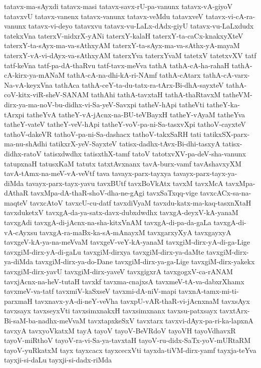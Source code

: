 {tatavx-ma-sAyxdi
tatavx-masi
tatavx-savx-rU-pa-vanunx
tatavx-vA-giyoV
tatavxvU
tatavx-vanenx
tatavx-vanunx
tatavx-veMdu
tatavxveV
tatavx-vi-cA-ra-vanunx
tatavx-vi-deyo
tatavxvu
tatavx-vu-LaLx-dAdx-giyU
tatavx-vu-LaLxdudx
tatekxVna
taterxV-nidxrX-yANi
taterxY-kalaH
taterxY-ta-caCx-knakxyXteV
taterxY-ta-sAyx-ma-va-sAthxyAM
taterxY-ta-sAyx-ma-va-sAthx-yA-mayaM
taterxY-vA-vi-dAyx-va-sAthxyAM
taterxYva
taterxYvaM
tatetxV
tatetxvXV
tatf
tatf-keVna
tatf-pa-dA-thaRvu
tatf-tavx-meVva
tathA
tathA-cA-ha-rahaH
tathA-cA-kirx-ya-mANaM
tathA-cA-na-dhi-kA-ri-NAmf
tathA-cAtarx
tathA-cA-varx-Na-vA-keyxVna
tathAca
tathA-ceY-ta-du-tatx-ra-tArx-Bi-dhA-sayxteV
tathA-coV-kitx-viR-sheV-SANAM
tathAhi
tathA-tavxtaH
tathA-thaRtavxM
tatheVM-dirx-ya-ma-noV-bu-didhx-vi-Sa-yeV-Savxpi
tatheV-hApi
tatheVti
tatheY-ka-tArxpi
tatheYvA
tatheY-vA-jAcnx-na-BU-teVBayxH
tatheY-vAyaM
tatheYva
tatheY-vateV
tatheY-veV-hApi
tatheY-voV-pa-ni-Sa-tasxvXpi
tathoV-cayxteV
tathoV-dakeVR
tathoV-pa-ni-Sa-dashacx
tathoV-takxSaRH
tati
tatikxSX-parx-ma-nu-shAdhi
tatikxrX-yeV-SayxteV
tatisx-dadhx-tAvx-Bi-dhi-tasxyA
tatisx-didhx-ratoV
tatisxdwdhx
tatisxthX-tamf
tatoV
tatotxvXV-pa-deV-sha-vanunx
tatupxnaH
tatusxKaM
tatutx
tatxtAvxnanx
tavA-burx-vamf
tavAshavxyXM
tavA-tAmx-na-meV-vA-veVtf
tava
tavayx-parx-tayxya
tavayx-parx-tayx-ya-diMda
tavayx-parx-tayx-yavu
tavxBUtf
tavxBoVkAtx
tavxM
tavxMcA
tavxMpa-dAthaR
tavxMpa-dA-thaR-shoV-dha-ne-gAgi
tavxSaTxqq-vige
tavxcACx-sa-na-maqteV
tavxcAtoV
tavxcU-cu-datf
tavxdiVyaM
tavxdu-katx-ma-kaq-tasxnXtaH
tavxduketxV
tavxgA-da-ya-satx-davx-dubxdwdhx
tavxgA-deyxV-kA-yanaM
tavxgAdi
tavxgA-di-jAcnx-na-sha-kitxVnAM
tavxgA-di-pa-da-gaLa
tavxgA-di-vA-cAyxsu
tavxgA-ra-maBx-ka-sA-mAnayxM
tavxgarxyXyA
tavxgayxyA
tavxgeV-kA-ya-na-meVvaM
tavxgeV-veY-kA-yanaM
tavxgiM-dirx-yA-di-ga-Lige
tavxgiM-dirx-yA-di-gaLu
tavxgiM-dirxya
tavxgiM-dirx-ya-daMte
tavxgiM-dirx-ya-diMda
tavxgiM-dirx-ya-do-Dane
tavxgiM-dirx-ya-ga-Lige
tavxgiM-dirx-yakekx
tavxgiM-dirx-yavU
tavxgiM-dirx-yaveV
tavxgigxrA
tavxgogxV-ca-rANAM
tavxjAcnx-na-heV-tutaH
tavxkf
tavxma-cnajxsA
tavxmeV-tA-va-dabxrXhamx
tavxmeV-va-tatf
tavxmiV-kaSxseV
tavxmi-dA-niV-mapi
tavxnA-tamx-mi-ti-parxmaH
tavxnavx-yA-di-neY-veVha
tavxpU-vAR-thaR-vi-jAcnxnaM
tavxsAyx
tavxsayx
tavxseyxVti
tavxsimxnakxH
tavxsimxnanx
tavxsu-patxsayx
tavxtArx-Bi-saM-ba-nadhx-meVvaM
tavxtapxkeSxV
tavxtarx
tavxvi-dAyx-pa-ri-ka-lapxnA
tavxyA
tavxyoVkatxM
tayA
tayoV
tayoV-BeVRdoV
tayoVH
tayoVdhavxR
tayoV-miRthoV
tayoV-ra-vi-Sa-ya-tavxtaH
tayoV-ru-didx-SaTx-yoV-mURtaRM
tayoV-yuRkatxM
tayx
tayxcacx
tayxcecxVti
tayxda-tiVM-dirx-yamf
tayxja-teYva
tayxji-si-daLu
tayxji-si-dadx-riMda
}
